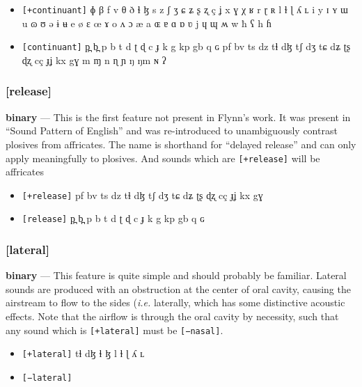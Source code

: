 \documentclass[10pt,letterpaper]{article}
\begin{document}
\begin{itemize}
\item \texttt{[+continuant]} ɸ β f v θ ð ɬ ɮ s z ʃ ʒ ɕ ʑ ʂ ʐ ç ʝ x ɣ χ ʁ r ɽ ʀ l ɫ ɭ ʎ ʟ i y ɪ ʏ ɯ u ɷ ʊ ə ɨ ʉ e ø ɛ œ ɤ o ʌ ɔ æ a ɶ ɐ ɑ ɒ ʋ j ɥ ɰ ʍ w ħ ʕ h ɦ 
\item \texttt{[continuant]} p̪ b̪ p b t d ʈ ɖ c ɟ k g kp gb q ɢ pf bv ts dz tɬ dɮ tʃ dʒ tɕ dʑ ʈʂ ɖʐ cç ɟʝ kx gɣ m ɱ n ɳ ɲ ŋ ŋm ɴ ʔ 
\end{itemize}

\subsubsection{[release]}
\label{ssub:feature_release}
\textbf{binary} — This is the first feature not present in Flynn's work. It was present in ``Sound Pattern of English'' and was re-introduced to unambiguously contrast plosives from affricates. The name is shorthand for ``delayed release'' and can only apply meaningfully to plosives. And sounds which are \texttt{[+release]} will be affricates

\begin{itemize}
\item \texttt{[+release]} pf bv ts dz tɬ dɮ tʃ dʒ tɕ dʑ ʈʂ ɖʐ cç ɟʝ kx gɣ 

\item \texttt{[release]} p̪ b̪ p b t d ʈ ɖ c ɟ k g kp gb q ɢ

\end{itemize}

\subsubsection{[lateral]}
\label{ssub:feature_lateral}
\textbf{binary} — This feature is quite simple and should probably be familiar. Lateral sounds are produced with an obstruction at the center of oral cavity, causing the airstream to flow to the sides (\emph{i.e.} laterally, which has some distinctive acoustic effects. Note that the airflow is through the oral cavity by necessity, such that any sound which is \texttt{[+lateral]} must be \texttt{[−nasal]}.

\begin{itemize}
\item \texttt{[+lateral]} tɬ dɮ ɬ ɮ l ɫ ɭ ʎ ʟ 
\item \texttt{[−lateral]}
\end{itemize}
\end{document}
